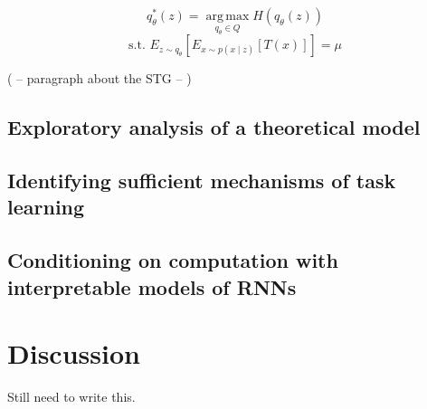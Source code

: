 \documentclass[11pt]{article}
\begin{document}
\[q_\theta^*(z) = \mathop{\arg\,\max}\limits_{q_\theta \in Q} H(q_\theta(z)) \]
\[ \text{s.t.  } E_{z \sim q_\theta}\left[ E_{x\sim p(x \mid z)}\left[T(x)\right] \right] = \mu \]


( -- paragraph about the STG -- )

\subsection{Exploratory analysis of a theoretical model}


\subsection{Identifying sufficient mechanisms of task learning}


\subsection{Conditioning on computation with interpretable models of RNNs}


\section{Discussion}
Still need to write this.



\end{document}
